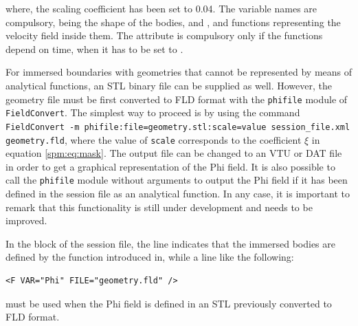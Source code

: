 where, the scaling coefficient has been set to 0.04. The variable names are compulsory, being  the shape of the bodies, and ,  and  functions representing the velocity field inside them. The attribute  is compulsory only if the functions depend on time, when it has to be set to .

For immersed boundaries with geometries that cannot be represented by means of analytical functions, an STL binary file can be supplied as well. However, the geometry file must be first converted to FLD format with the \texttt{phifile} module of \texttt{FieldConvert}. The simplest way to proceed is by using the command \texttt{FieldConvert -m phifile:file=geometry.stl:scale=value session\_file.xml geometry.fld}, where the value of \texttt{scale} corresponds to the coefficient $\xi$ in equation \eqref{spm:eq:mask}. The output file can be changed to an VTU or DAT file in order to get a graphical representation of the Phi field. It is also possible to call the \texttt{phifile} module without arguments to output the Phi field if it has been defined in the session file as an analytical function. In any case, it is important to remark that this functionality is still under development and needs to be improved.

In the  block of the session file, the line  indicates that the immersed bodies are defined by the function introduced in, while a line like the following:

\begin{lstlisting}[style=XMLStyle]
    <F VAR="Phi" FILE="geometry.fld" />
\end{lstlisting}

must be used when the Phi field is defined in an STL previously converted to FLD format.
